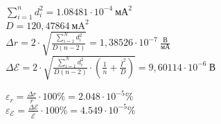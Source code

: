 
\begin{center}
    $\sum\limits_{i=1}^{n}d_i^2 = 1.08481 \cdot 10^{-4} \ \text{мА}^2$ \\
    $D = 120,47864 \ \text{мA}^2$ \\
    $\Delta r = 2 \cdot \sqrt{\frac{\sum\limits_{i=1}^N d_i^2}{D (n-2)}} = 1,38526 \cdot 10^{-7} \ \frac{\text{В}}{мА}$ \\
    $\Delta \mathcal{E} = 2 \cdot \sqrt{\frac{\sum\limits_{i=1}^N d_i^2}{D (n-2)}\cdot \left(\frac{1}{n} + \frac{\overline{I}^2}{D}\right)} = 9,60114 \cdot 10^{-6} \ \text{В}$
\end{center}


\begin{center}
    $\varepsilon_r = \frac{\Delta r}{\overline{r}} \cdot 100\% = 2.048 \cdot 10^{-5}\%$ \\
    $\varepsilon_{\mathcal{E}} = \frac{\Delta \mathcal{E}}{\overline{\mathcal{E}}} \cdot 100\% = 4.549 \cdot 10^{-5}\%$
\end{center}